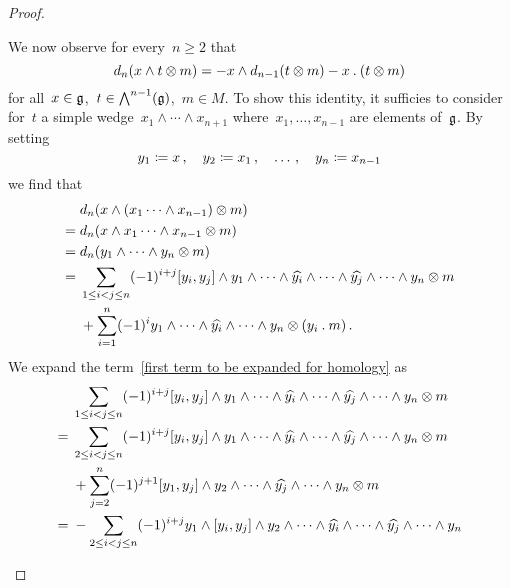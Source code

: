 \begin{proof}
\begin{enumerate}
			We now observe for every~$n \geq 2$ that
			\begin{equation}
				\label{important identity for homology}
				d_n( x \wedge t \otimes m )
				=
				- x \wedge d_{n-1}( t \otimes m)
				- x \mathbin{.} (t \otimes m)
			\end{equation}
			for all~$x \in \mathfrak{g}$,~$t \in \operatorname{\bigwedge}^{n-1}(\mathfrak{g})$,~$m \in M$.
			To show this identity, it sufficies to consider for~$t$ a simple wedge~$x_1 \wedge \dotsb \wedge x_{n+1}$ where~$x_1, \dotsc, x_{n-1}$ are elements of~$\mathfrak{g}$.
			By setting
			\[
				y_1 \coloneqq x \,,
				\quad
				y_2 \coloneqq x_1 \,,
				\quad
				\dotsc \,,
				\quad
				y_n \coloneqq x_{n-1}
			\]
			we find that
			\begin{align}
				{}&
				d_n( x \wedge (x_1 \dotsb \wedge x_{n-1}) \otimes m )
				\notag
				\\
				={}&
				d_n ( x \wedge x_1 \dotsb \wedge x_{n-1} \otimes m )
				\notag
				\\
				={}&
				d_n ( y_1 \wedge \dotsb \wedge y_n \otimes m )
				\notag
				\\
				={}&
				\sum_{1 \leq i < j \leq n}
				(-1)^{i + j}
				[y_i, y_j] \wedge y_1 \wedge \dotsb \wedge \widehat{y_i} \wedge \dotsb \wedge \widehat{y_j} \wedge \dotsb \wedge y_n
				\otimes m
				\label{first term to be expanded for homology}
				\\
				{}&
				+
				\sum_{i=1}^n
				(-1)^i
				y_1 \wedge \dotsb \wedge \widehat{y_i} \wedge \dotsb \wedge y_n \otimes (y_i \mathbin{.} m) \,.
				\label{second term to be expanded for homology}
			\end{align}
			We expand the term~\eqref{first term to be expanded for homology} as
			\begingroup
			\allowdisplaybreaks
			\begin{align*}
				{}&
				\sum_{1 \leq i < j \leq n}
				(-1)^{i + j}
				[y_i, y_j] \wedge y_1 \wedge \dotsb \wedge \widehat{y_i} \wedge \dotsb \wedge \widehat{y_j} \wedge \dotsb \wedge y_n
				\tensor m
				\\
				={}&
				\sum_{2 \leq i < j \leq n}
				(-1)^{i + j}
				[y_i, y_j] \wedge y_1 \wedge \dotsb \wedge \widehat{y_i} \wedge \dotsb \wedge \widehat{y_j} \wedge \dotsb \wedge y_n
				\tensor m
				\\
				{}&
				+
				\sum_{j=2}^n
				(-1)^{j+1}
				[y_1, y_j] \wedge y_2 \wedge \dotsb \wedge \widehat{y_j} \wedge \dotsb \wedge y_n
				\tensor m
				\\
				={}&
				-
				\sum_{2 \leq i < j \leq n}
				(-1)^{i + j}
				y_1 \wedge [y_i, y_j] \wedge y_2 \wedge \dotsb \wedge \widehat{y_i} \wedge \dotsb \wedge \widehat{y_j} \wedge \dotsb \wedge y_n

\end{align*}
\end{enumerate}
\end{proof}
